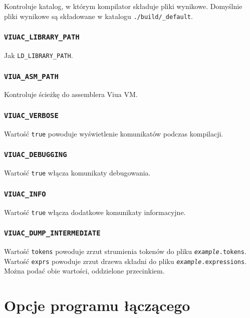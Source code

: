 \documentclass[11pt,oneside,a4paper,titlepage,onecolumn]{article}
\begin{document}
Kontroluje katalog, w którym kompilator składuje pliki wynikowe. Domyślnie pliki wynikowe są składowane w
katalogu \texttt{./build/\_default}.

\subsubsection{\texttt{VIUAC\_LIBRARY\_PATH}}

Jak \texttt{LD\_LIBRARY\_PATH}.

\subsubsection{\texttt{VIUA\_ASM\_PATH}}

Kontroluje ścieżkę do assemblera Viua VM.

\subsubsection{\texttt{VIUAC\_VERBOSE}}

Wartość \texttt{true} powoduje wyświetlenie komunikatów podczas kompilacji.

\subsubsection{\texttt{VIUAC\_DEBUGGING}}

Wartość \texttt{true} włącza komunikaty debugowania.

\subsubsection{\texttt{VIUAC\_INFO}}

Wartość \texttt{true} włącza dodatkowe komunikaty informacyjne.

\subsubsection{\texttt{VIUAC\_DUMP\_INTERMEDIATE}}

Wartość \texttt{tokens} powoduje zrzut strumienia tokenów do pliku \texttt{\emph{example}.tokens}.
Wartość \texttt{exprs} powoduje zrzut drzewa składni do pliku \texttt{\emph{example}.expressions}.
Można podać obie wartości, oddzielone przecinkiem.

\newpage
\section{Opcje programu łączącego}
\end{document}
